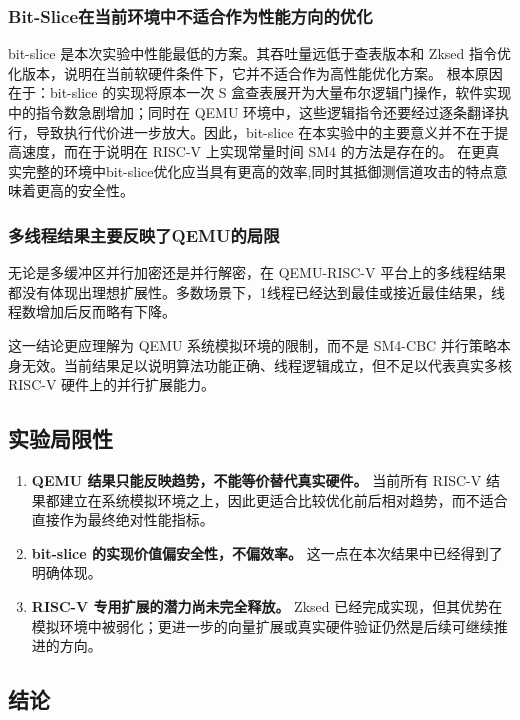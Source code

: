 \subsubsection{Bit-Slice在当前环境中不适合作为性能方向的优化}

bit-slice 是本次实验中性能最低的方案。其吞吐量远低于查表版本和 Zksed 指令优化版本，说明在当前软硬件条件下，它并不适合作为高性能优化方案。
根本原因在于：bit-slice 的实现将原本一次 S 盒查表展开为大量布尔逻辑门操作，软件实现中的指令数急剧增加；同时在 QEMU 环境中，这些逻辑指令还要经过逐条翻译执行，导致执行代价进一步放大。因此，bit-slice 在本实验中的主要意义并不在于提高速度，而在于说明在 RISC-V 上实现常量时间 SM4 的方法是存在的。
在更真实完整的环境中bit-slice优化应当具有更高的效率,同时其抵御测信道攻击的特点意味着更高的安全性。

\subsubsection{多线程结果主要反映了QEMU的局限}
无论是多缓冲区并行加密还是并行解密，在 QEMU-RISC-V 平台上的多线程结果都没有体现出理想扩展性。多数场景下，1线程已经达到最佳或接近最佳结果，线程数增加后反而略有下降。

这一结论更应理解为 QEMU 系统模拟环境的限制，而不是 SM4-CBC 并行策略本身无效。当前结果足以说明算法功能正确、线程逻辑成立，但不足以代表真实多核 RISC-V 硬件上的并行扩展能力。

\subsection{实验局限性}

\begin{enumerate}
    \item \textbf{QEMU 结果只能反映趋势，不能等价替代真实硬件。} 当前所有 RISC-V 结果都建立在系统模拟环境之上，因此更适合比较优化前后相对趋势，而不适合直接作为最终绝对性能指标。
    \item \textbf{bit-slice 的实现价值偏安全性，不偏效率。} 这一点在本次结果中已经得到了明确体现。
    \item \textbf{RISC-V 专用扩展的潜力尚未完全释放。} Zksed 已经完成实现，但其优势在模拟环境中被弱化；更进一步的向量扩展或真实硬件验证仍然是后续可继续推进的方向。
\end{enumerate}

\subsection{结论}

